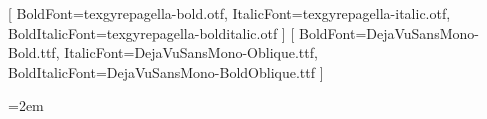 \usepackage[paperwidth=6in,paperheight=9in,margin=0.75in,inner=0.875in]{geometry}
\usepackage{fontspec}
\setmainfont{texgyrepagella-regular.otf}[
  BoldFont=texgyrepagella-bold.otf,
  ItalicFont=texgyrepagella-italic.otf,
  BoldItalicFont=texgyrepagella-bolditalic.otf
]
\setmonofont{DejaVuSansMono.ttf}[
  BoldFont=DejaVuSansMono-Bold.ttf,
  ItalicFont=DejaVuSansMono-Oblique.ttf,
  BoldItalicFont=DejaVuSansMono-BoldOblique.ttf
]
\usepackage{microtype}
\usepackage{fancyhdr}
\pagestyle{fancy}
\fancyhf{}
\fancyhead[LE]{\small\leftmark}
\fancyhead[RO]{\small\rightmark}
\fancyfoot[C]{\small\thepage}
\renewcommand{\headrulewidth}{0.4pt}

\setcounter{secnumdepth}{-2}
\setcounter{tocdepth}{1}
\raggedbottom
\emergencystretch=2em                %
\usepackage{setspace}
\usepackage{fvextra}
